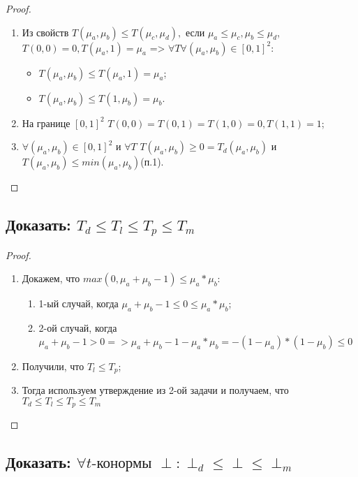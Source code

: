 \documentclass[12pt]{article}
\begin{document}
\begin{proof}
    \begin{enumerate}
        \item Из свойств $T(\mu_a, \mu_b) \le T(\mu_c, \mu_d), \text{ если } \mu_a\le\mu_c, \mu_b\le\mu_d$, $T(0, 0) = 0, T(\mu_a, 1) = \mu_a$ => $\forall T \forall (\mu_a, \mu_b)\in[0,1]^2$:
            \begin{itemize}
                \item $T(\mu_a, \mu_b) \le T(\mu_a, 1)=\mu_a$;
                \item $T(\mu_a, \mu_b) \le T(1, \mu_b)=\mu_b$.
            \end{itemize}
        \item На границе $[0, 1]^2$ $T(0, 0)=T(0, 1)=T(1, 0)=0, T(1, 1)=1$;
        \item $\forall(\mu_a, \mu_b)\in[0, 1]^2$ и $\forall T$
    $T(\mu_a, \mu_b)\ge 0=T_d(\mu_a, \mu_b)$ и $T(\mu_a, \mu_b)\le min(\mu_a, \mu_b)$(п.1).
    \end{enumerate}
\end{proof}

\subsection{Доказать: $T_d\le T_l\le T_p\le T_m$}

\begin{proof}
    \begin{enumerate}
        \item Докажем, что $max(0, \mu_a+\mu_b-1)\le\mu_a*\mu_b$:
            \begin{enumerate}
                \item 1-ый случай, когда $\mu_a+\mu_b-1\le0\le\mu_a*\mu_b$;
                \item 2-ой случай, когда $\mu_a+\mu_b-1>0 => \mu_a+\mu_b-1-\mu_a*\mu_b=-(1-\mu_a)*(1-\mu_b)\le 0$
            \end{enumerate}
        \item Получили, что $T_l\le T_p$;
        \item Тогда используем утверждение из 2-ой задачи и получаем, что 
   $T_d\le T_l\le T_p\le T_m$
    \end{enumerate}
\end{proof}

\subsection{Доказать: $\forall t\text{-конормы } \perp: \perp_d\le \perp \le \perp_m$}
\end{document}
